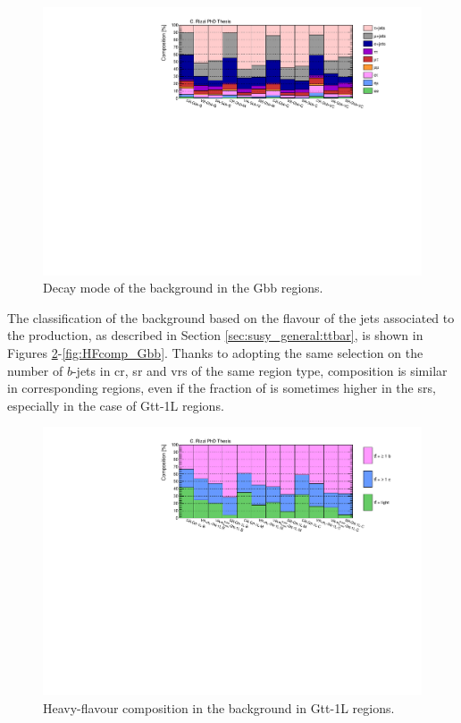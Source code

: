 \begin{figure}[htbp]
\includegraphics[width=\textwidth]{figures/strong_prod/comp_plots/Gbb_tt.pdf}
\caption{Decay mode of the \ttbar background in the Gbb regions.}
	\label{fig:ttcomp_Gbb}
\end{figure}


The classification of the \ttbar background based on the flavour of the jets associated to the 
\ttbar production, as described in Section \ref{sec:susy_general:ttbar}, is shown in Figures 
\ref{fig:HFcomp_Gtt1L}-\ref{fig:HFcomp_Gbb}.
Thanks to adopting the same selection on the number of $b$-jets in \gls{cr}, \gls{sr} and \glspl{vr} 
of the same region type, composition is similar in corresponding regions, even if the fraction of 
\tthf is sometimes higher in the \glspl{sr}, especially in the case of Gtt-1L regions. 


\begin{figure}[htbp]
\includegraphics[width=\textwidth]{figures/strong_prod/comp_plots/Gtt_1L_HF.pdf}
\caption{Heavy-flavour composition in the \ttbar background in Gtt-1L regions.}
	\label{fig:HFcomp_Gtt1L}
\end{figure}

